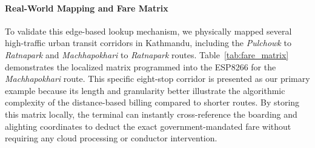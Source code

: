 \documentclass[manuscript,review,anonymous]{acmart}
\begin{document}
\paragraph{\textbf{Real-World Mapping and Fare Matrix}}
To validate this edge-based lookup mechanism, we physically mapped several high-traffic urban transit corridors in Kathmandu, including the \textit{Pulchowk} to \textit{Ratnapark} and \textit{Machhapokhari} to \textit{Ratnapark} routes. Table~\ref{tab:fare_matrix} demonstrates the localized matrix programmed into the ESP8266 for the \textit{Machhapokhari} route. This specific eight-stop corridor is presented as our primary example because its length and granularity better illustrate the algorithmic complexity of the distance-based billing compared to shorter routes. By storing this matrix locally, the terminal can instantly cross-reference the boarding and alighting coordinates to deduct the exact government-mandated fare without requiring any cloud processing or conductor intervention.
\end{document}
